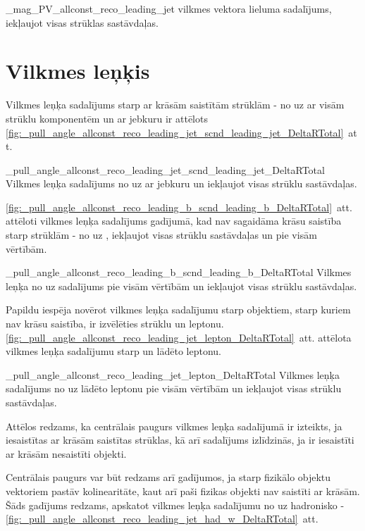           {_mag_PV_allconst_reco_leading_jet}
          {\leadingjet vilkmes vektora lieluma sadalījums, iekļaujot visas strūklas sastāvdaļas.}

\section{Vilkmes leņķis}

Vilkmes leņķa sadalījums starp ar krāsām saistītām strūklām - no \leadingjet uz \scndleadingjet ar visām strūklu komponentēm un ar jebkuru \DeltaR ir attēlots \ref{fig:_pull_angle_allconst_reco_leading_jet_scnd_leading_jet_DeltaRTotal}~att.

          {_pull_angle_allconst_reco_leading_jet_scnd_leading_jet_DeltaRTotal}
          {Vilkmes leņķa sadalījums no \leadingjet uz \scndleadingjet ar jebkuru \DeltaR un iekļaujot visas strūklu sastāvdaļas.}


\ref{fig:_pull_angle_allconst_reco_leading_b_scnd_leading_b_DeltaRTotal}~att. attēloti vilkmes leņķa sadalījums gadījumā, kad nav sagaidāma krāsu saistība starp strūklām - no \leadingb uz \scndleadingb, iekļaujot visas strūklu sastāvdaļas un pie visām \DeltaR vērtībām.

          {_pull_angle_allconst_reco_leading_b_scnd_leading_b_DeltaRTotal}
          {Vilkmes leņķa no \leadingb uz \scndleadingb sadalījums pie visām \DeltaR vērtībām un iekļaujot visas strūklu sastāvdaļas.}

Papildu iespēja novērot vilkmes leņķa sadalījumu starp objektiem, starp kuriem nav krāsu saistība, ir izvēlēties strūklu un leptonu. \ref{fig:_pull_angle_allconst_reco_leading_jet_lepton_DeltaRTotal}~att. attēlota vilkmes leņķa sadalījumu starp \leadingjet un lādēto leptonu. 

          {_pull_angle_allconst_reco_leading_jet_lepton_DeltaRTotal}
          {Vilkmes leņķa sadalījums no \leadingjet uz lādēto leptonu pie visām \DeltaR vērtībām un iekļaujot visas strūklu sastāvdaļas.}

Attēlos redzams, ka centrālais paugurs vilkmes leņķa sadalījumā ir izteikts, ja iesaistītas ar krāsām saistītas strūklas, kā arī sadalījums izlīdzinās, ja ir iesaistīti ar krāsām nesaistīti objekti. 

Centrālais paugurs var būt redzams arī gadījumos, ja starp fizikālo objektu vektoriem pastāv kolinearitāte, kaut arī paši fizikas objekti nav saistīti ar krāsām. Šāds gadījums redzams, apskatot vilkmes leņķa sadalījumu no \leadingjet uz hadronisko \PW - \ref{fig:_pull_angle_allconst_reco_leading_jet_had_w_DeltaRTotal}~att. 

